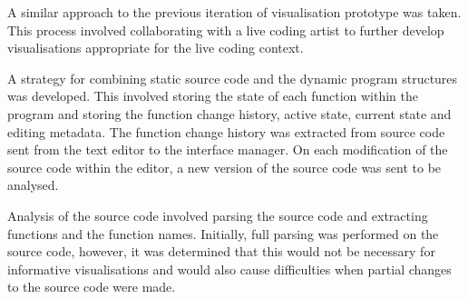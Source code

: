 A similar approach to the previous iteration of visualisation prototype was taken. This process involved collaborating with a live coding artist to further develop visualisations appropriate for the live coding context.

A strategy for combining static source code and the dynamic program structures was developed. This involved storing the state of each function within the program and storing the function change history, active state, current state and editing metadata. The function change history was extracted from source code sent from the text editor to the interface manager. On each modification of the source code within the editor, a new version of the source code was sent to be analysed.

Analysis of the source code involved parsing the source code and extracting functions and the function names. Initially, full parsing was performed on the source code, however, it was determined that this would not be necessary for informative visualisations and would also cause difficulties when partial changes to the source code were made. 

\more








